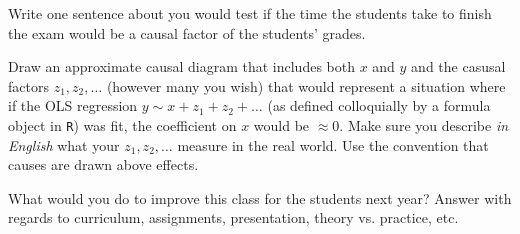 \documentclass[12pt]{article}
\begin{document}
 Write one sentence about you would test if the time the students take to finish the exam would be a causal factor of the students' grades.

 Draw an approximate causal diagram that includes both $x$ and $y$ and the casusal factors $z_1, z_2, \ldots$ (however many you wish) that would represent a situation where if the OLS regression $y \sim x + z_1 + z_2 + \ldots$ (as defined colloquially by a formula object in \texttt{R}) was fit, the coefficient on $x$ would be $\approx 0$. Make sure you describe \textit{in English} what your $z_1, z_2, \ldots$ measure in the real world. Use the convention that causes are drawn above effects. 

 What would you do to improve this class for the students next year? Answer with regards to curriculum, assignments, presentation, theory vs. practice, etc.


\eenum
\end{document}
